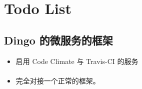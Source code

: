   \section{Todo List} \label{TODOLISTref}

  \subsection{Dingo 的微服务的框架}
  \begin{itemize}
    \item 启用 Code Climate 与 Travis-CI 的服务
  \end{itemize}
  \paragraph{}
  \begin{itemize}
    \item 完全对接一个正常的框架。
  \end{itemize}

